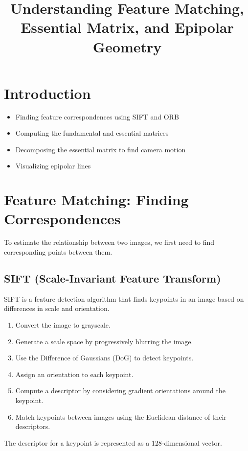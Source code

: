\documentclass{article}
\title{Understanding Feature Matching, Essential Matrix, and Epipolar Geometry}
\begin{document}
\maketitle

\section{Introduction}
\begin{itemize}
    \item Finding feature correspondences using SIFT and ORB
    \item Computing the fundamental and essential matrices
    \item Decomposing the essential matrix to find camera motion
    \item Visualizing epipolar lines
\end{itemize}

\section{Feature Matching: Finding Correspondences}
To estimate the relationship between two images, we first need to find corresponding points between them.

\subsection{SIFT (Scale-Invariant Feature Transform)}
SIFT is a feature detection algorithm that finds keypoints in an image based on differences in scale and orientation.

\begin{enumerate}
    \item Convert the image to grayscale.
    \item Generate a scale space by progressively blurring the image.
    \item Use the Difference of Gaussians (DoG) to detect keypoints.
    \item Assign an orientation to each keypoint.
    \item Compute a descriptor by considering gradient orientations around the keypoint.
    \item Match keypoints between images using the Euclidean distance of their descriptors.
\end{enumerate}

The descriptor for a keypoint is represented as a 128-dimensional vector.
\end{document}
